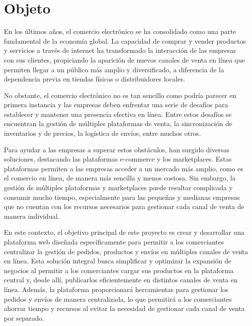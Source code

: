 \section{Objeto}
\label{intro:sec:objeto}

En los últimos años, el comercio electrónico se ha consolidado como una parte fundamental de la economía global. La capacidad de comprar y vender productos y servicios a través de internet ha transformado la interacción de las empresas con sus clientes, propiciando la aparición de nuevos canales de venta en línea que permiten llegar a un público más amplio y diversificado, a diferencia de la dependencia previa en tiendas físicas o distribuidores locales.

No obstante, el comercio electrónico no es tan sencillo como podría parecer en primera instancia y las empresas deben enfrentar una serie de desafíos para establecer y mantener una presencia efectiva en línea. Entre estos desafíos se encuentran la gestión de múltiples plataformas de venta, la sincronización de inventarios y de precios, la logística de envíos, entre muchos otros.

Para ayudar a las empresas a superar estos obstáculos, han surgido diversas soluciones, destacando las plataformas e-commerce y los marketplaces. Estas plataformas permiten a las empresas acceder a un mercado más amplio, como es el comercio en línea, de manera más sencilla y menos costosa. Sin embargo, la gestión de múltiples plataformas y marketplaces puede resultar complicada y consumir mucho tiempo, especialmente para las pequeñas y medianas empresas que no cuentan con los recursos necesarios para gestionar cada canal de venta de manera individual.

En este contexto, el objetivo principal de este proyecto es crear y desarrollar una plataforma web diseñada específicamente para permitir a los comerciantes centralizar la gestión de pedidos, productos y envíos en múltiples canales de venta en línea. Esta solución integral busca simplificar y optimizar la expansión de negocios al permitir a los comerciantes cargar sus productos en la plataforma central y, desde allí, publicarlos eficientemente en distintos canales de venta en línea. Además, la plataforma proporcionará herramientas para gestionar los pedidos y envíos de manera centralizada, lo que permitirá a los comerciantes ahorrar tiempo y recursos al evitar la necesidad de gestionar cada canal de venta por separado.